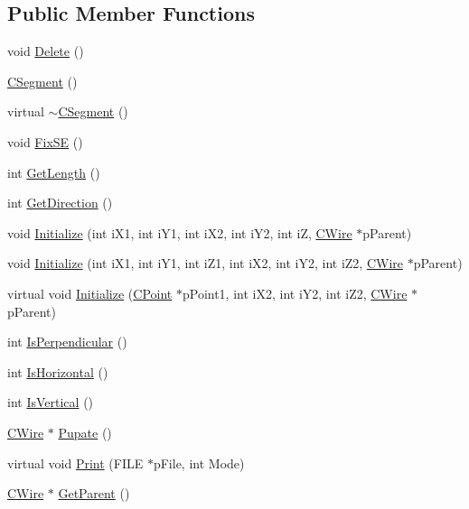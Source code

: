 \subsection*{Public Member Functions}
\begin{DoxyCompactItemize}
\item 
void \mbox{\hyperlink{classCSegment_ade04e03ed36a0f8a6dc95edb73394655}{Delete}} ()
\item 
\mbox{\hyperlink{classCSegment_a927fa31ee00562e3ca35b2fdf1194319}{C\+Segment}} ()
\item 
virtual \mbox{\hyperlink{classCSegment_a23c7a168b7a27aa3b8ad88862d7155a4}{$\sim$\+C\+Segment}} ()
\item 
void \mbox{\hyperlink{classCSegment_a05f048fb98b7138ffe4959d143b9267a}{Fix\+SE}} ()
\item 
int \mbox{\hyperlink{classCSegment_a3e3b6bee56494e679a5e6815dae3a9eb}{Get\+Length}} ()
\item 
int \mbox{\hyperlink{classCSegment_ae9a06a9de5c4375d85fcd451132bdd72}{Get\+Direction}} ()
\item 
void \mbox{\hyperlink{classCSegment_a4169ed50ec196a0f1bf4d5d458f2c15d}{Initialize}} (int i\+X1, int i\+Y1, int i\+X2, int i\+Y2, int iZ, \mbox{\hyperlink{classCWire}{C\+Wire}} $\ast$p\+Parent)
\item 
void \mbox{\hyperlink{classCSegment_aaecb99cf5cb003782674c788b4af4f91}{Initialize}} (int i\+X1, int i\+Y1, int i\+Z1, int i\+X2, int i\+Y2, int i\+Z2, \mbox{\hyperlink{classCWire}{C\+Wire}} $\ast$p\+Parent)
\item 
virtual void \mbox{\hyperlink{classCSegment_ade9b80c1a313a8a1b2d9969311ab8ce5}{Initialize}} (\mbox{\hyperlink{classCPoint}{C\+Point}} $\ast$p\+Point1, int i\+X2, int i\+Y2, int i\+Z2, \mbox{\hyperlink{classCWire}{C\+Wire}} $\ast$p\+Parent)
\item 
int \mbox{\hyperlink{classCSegment_a360ca1950279f25ab238e56e68e004c6}{Is\+Perpendicular}} ()
\item 
int \mbox{\hyperlink{classCSegment_a266ae5d5b2952937662d3b9a6164867c}{Is\+Horizontal}} ()
\item 
int \mbox{\hyperlink{classCSegment_aa21348278ff23628c2f49d2e5fba125e}{Is\+Vertical}} ()
\item 
\mbox{\hyperlink{classCWire}{C\+Wire}} $\ast$ \mbox{\hyperlink{classCSegment_a4d20ce3a783a16edc3973fa80e09ea5f}{Pupate}} ()
\item 
virtual void \mbox{\hyperlink{classCSegment_af1e339a0f89697ab0d851858aab13b89}{Print}} (F\+I\+LE $\ast$p\+File, int Mode)
\item 
\mbox{\hyperlink{classCWire}{C\+Wire}} $\ast$ \mbox{\hyperlink{classCSegment_a2337630eb7eff85f043a14c41dab7ddb}{Get\+Parent}} ()
\end{DoxyCompactItemize}
